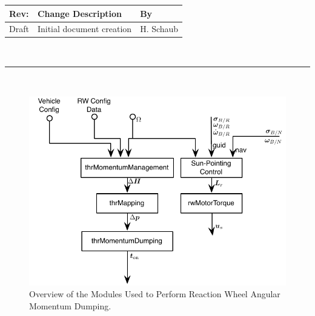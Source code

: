 \documentclass[]{BasiliskReportMemo}
\begin{document}
\makeCover


%
%
\pagestyle{empty}
{\renewcommand{\arraystretch}{1.1}
\noindent
\begin{longtable}{|p{0.5in}|p{4.5in}|p{1.14in}|}
\hline
{\bfseries Rev}: & {\bfseries Change Description} & {\bfseries By} \\
\hline
Draft & Initial document creation & H. Schaub \\
\hline

\end{longtable}
}

\newpage
\setcounter{page}{1}
\pagestyle{fancy}

\tableofcontents
~\\ \hrule ~\\

\begin{figure}[htb]
	\centerline{
	\includegraphics[]{Figures/rwMomentumOverview}
	}
	\caption{Overview of the Modules Used to Perform Reaction Wheel Angular Momentum Dumping.}
	\label{fig:Fig1}
\end{figure}
\end{document}
